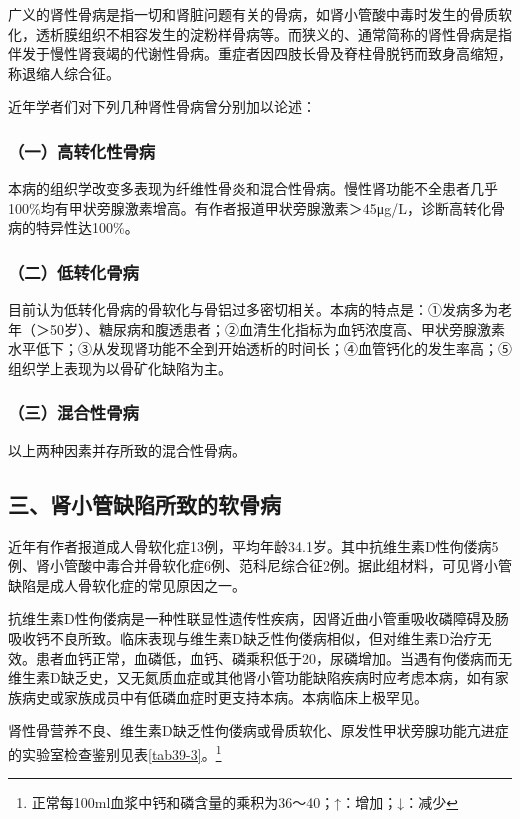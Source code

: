 广义的肾性骨病是指一切和肾脏问题有关的骨病，如肾小管酸中毒时发生的骨质软化，透析膜组织不相容发生的淀粉样骨病等。而狭义的、通常简称的肾性骨病是指伴发于慢性肾衰竭的代谢性骨病。重症者因四肢长骨及脊柱骨脱钙而致身高缩短，称退缩人综合征。

近年学者们对下列几种肾性骨病曾分别加以论述：

\subsubsection{（一）高转化性骨病}

本病的组织学改变多表现为纤维性骨炎和混合性骨病。慢性肾功能不全患者几乎100\%均有甲状旁腺激素增高。有作者报道甲状旁腺激素＞45μg/L，诊断高转化骨病的特异性达100\%。

\subsubsection{（二）低转化骨病}

目前认为低转化骨病的骨软化与骨铝过多密切相关。本病的特点是：①发病多为老年（＞50岁）、糖尿病和腹透患者；②血清生化指标为血钙浓度高、甲状旁腺激素水平低下；③从发现肾功能不全到开始透析的时间长；④血管钙化的发生率高；⑤组织学上表现为以骨矿化缺陷为主。

\subsubsection{（三）混合性骨病}

以上两种因素并存所致的混合性骨病。

\subsection{三、肾小管缺陷所致的软骨病}

近年有作者报道成人骨软化症13例，平均年龄34.1岁。其中抗维生素D性佝偻病5例、肾小管酸中毒合并骨软化症6例、范科尼综合征2例。据此组材料，可见肾小管缺陷是成人骨软化症的常见原因之一。

抗维生素D性佝偻病是一种性联显性遗传性疾病，因肾近曲小管重吸收磷障碍及肠吸收钙不良所致。临床表现与维生素D缺乏性佝偻病相似，但对维生素D治疗无效。患者血钙正常，血磷低，血钙、磷乘积低于20，尿磷增加。当遇有佝偻病而无维生素D缺乏史，又无氮质血症或其他肾小管功能缺陷疾病时应考虑本病，如有家族病史或家族成员中有低磷血症时更支持本病。本病临床上极罕见。

肾性骨营养不良、维生素D缺乏性佝偻病或骨质软化、原发性甲状旁腺功能亢进症的实验室检查鉴别见表\ref{tab39-3}。\footnote{正常每100ml血浆中钙和磷含量的乘积为36～40；↑：增加；↓：减少}

